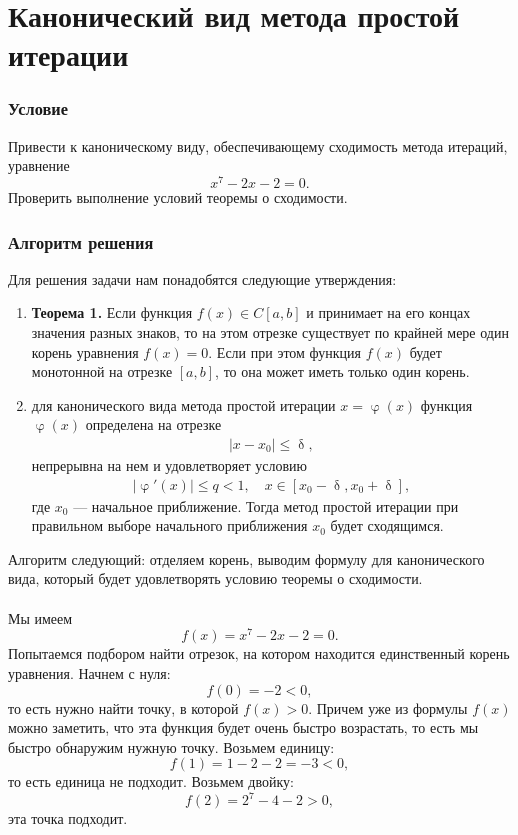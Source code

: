 \documentclass[a4paper, 12pt]{article}
\renewcommand{\leq}{\leqslant}
\renewcommand{\delta}{\updelta}
\renewcommand{\varphi}{\upvarphi}
\begin{document}
	\section*{Канонический вид метода простой итерации}
	\subsubsection*{Условие}
	Привести к каноническому виду, обеспечивающему сходимость метода итераций, уравнение $$x^7 - 2x - 2=0.$$ Проверить выполнение условий теоремы о сходимости.
	\subsubsection*{Алгоритм решения}
	Для решения задачи нам понадобятся следующие утверждения:
	\begin{enumerate}
		\item \textbf{Теорема 1.} Если функция $f(x)\in C[a,b]$ и принимает на его концах значения разных знаков, то на этом отрезке существует по крайней мере один корень уравнения $f(x) = 0$.
		Если при этом функция $f(x)$ будет монотонной на отрезке $[a,b]$, то она может иметь только один корень.
		\item для канонического вида метода простой итерации $x = \varphi(x)$ функция $\varphi(x)$ определена на отрезке \begin{eqnarray}
			|x - x_0| \leq \delta,
		\end{eqnarray} непрерывна на нем и удовлетворяет условию \begin{eqnarray}
		|\varphi'(x)| \leq q < 1,\quad x \in [x_0-\delta, x_0 + \delta],
		\end{eqnarray}
		где $x_0$ --- начальное приближение.
		Тогда метод простой итерации при правильном выборе начального приближения $x_0$ будет сходящимся.
	\end{enumerate}
	Алгоритм следующий: отделяем корень, выводим формулу для канонического вида, который будет удовлетворять условию теоремы о сходимости.
	\\\\
	Мы имеем $$f(x) = x^7 -2x-2 = 0.$$
	Попытаемся подбором найти отрезок, на котором находится единственный корень уравнения. Начнем с нуля:
	$$f(0) = -2 < 0,$$
	то есть нужно найти точку, в которой $f(x)>0$. Причем уже из формулы $f(x)$ можно заметить, что эта функция будет очень быстро возрастать, то есть мы быстро обнаружим нужную точку. Возьмем единицу:
	$$f(1) = 1-2-2=-3 < 0,$$
	то есть единица не подходит. Возьмем двойку:
	$$f(2) = 2^7 - 4 - 2 > 0,$$
	эта точка подходит.\\\\
\end{document}

